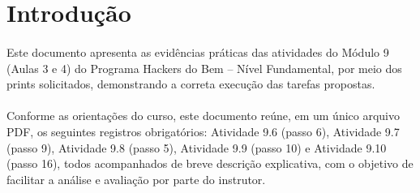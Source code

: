 \section{Introdução}

\paragraph{}
Este documento apresenta as evidências práticas das atividades do Módulo 9
(Aulas 3 e 4) do Programa Hackers do Bem -- Nível Fundamental, por meio dos
prints solicitados, demonstrando a correta execução das tarefas propostas.

\paragraph{}
Conforme as orientações do curso, este documento reúne, em um único arquivo
PDF, os seguintes registros obrigatórios: Atividade 9.6 (passo 6), Atividade
9.7 (passo 9), Atividade 9.8 (passo 5), Atividade 9.9 (passo 10) e Atividade
9.10 (passo 16), todos acompanhados de breve descrição explicativa, com o
objetivo de facilitar a análise e avaliação por parte do instrutor.
